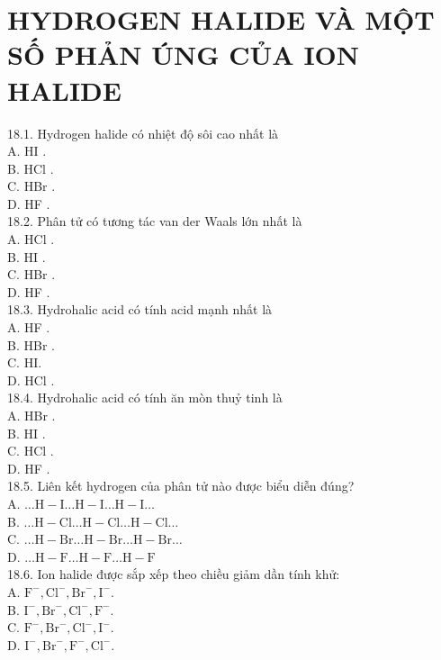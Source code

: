 \documentclass[10pt]{article}
\begin{document}
\section*{HYDROGEN HALIDE VÀ MỘT SỐ PHẢN ÚNG CỦA ION HALIDE}
18.1. Hydrogen halide có nhiệt độ sôi cao nhất là\\
A. HI .\\
B. HCl .\\
C. HBr .\\
D. HF .\\
18.2. Phân tử có tương tác van der Waals lớn nhất là\\
A. HCl .\\
B. HI .\\
C. HBr .\\
D. HF .\\
18.3. Hydrohalic acid có tính acid mạnh nhất là\\
A. HF .\\
B. HBr .\\
C. HI.\\
D. HCl .\\
18.4. Hydrohalic acid có tính ăn mòn thuỷ tinh là\\
A. HBr .\\
B. HI .\\
C. HCl .\\
D. HF .\\
18.5. Liên kết hydrogen của phân tử nào được biểu diễn đúng?\\
A. $\ldots \mathrm{H}-\mathrm{I} \ldots \mathrm{H}-\mathrm{I} \ldots \mathrm{H}-\mathrm{I} \ldots$\\
B. $\ldots \mathrm{H}-\mathrm{Cl} \ldots \mathrm{H}-\mathrm{Cl} \ldots \mathrm{H}-\mathrm{Cl} \ldots$\\
C. $\ldots \mathrm{H}-\mathrm{Br} \ldots \mathrm{H}-\mathrm{Br} \ldots \mathrm{H}-\mathrm{Br} \ldots$\\
D. $\ldots \mathrm{H}-\mathrm{F} \ldots \mathrm{H}-\mathrm{F} \ldots \mathrm{H}-\mathrm{F}$\\
18.6. Ion halide được sắp xếp theo chiều giảm dần tính khử:\\
A. $\mathrm{F}^{-}, \mathrm{Cl}^{-}, \mathrm{Br}^{-}, \mathrm{I}^{-}$.\\
B. $\mathrm{I}^{-}, \mathrm{Br}^{-}, \mathrm{Cl}^{-}, \mathrm{F}^{-}$.\\
C. $\mathrm{F}^{-}, \mathrm{Br}^{-}, \mathrm{Cl}^{-}, \mathrm{I}^{-}$.\\
D. $\mathrm{I}^{-}, \mathrm{Br}^{-}, \mathrm{F}^{-}, \mathrm{Cl}^{-}$.\\
\end{document}
